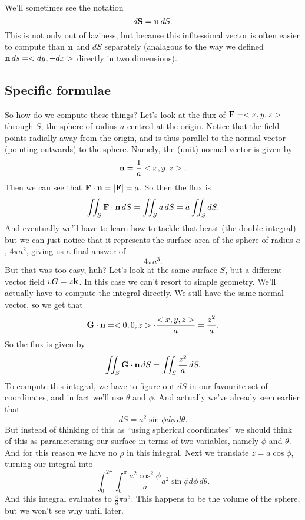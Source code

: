 We'll sometimes see the notation
\[ d\boldsymbol{\mathbf{S}} = \boldsymbol{\mathbf{n}}\,dS. \]
This is not only out of laziness, but because this infitessimal vector is often easier to compute than $\boldsymbol{\mathbf{n}}$ and $dS$ separately (analagous to the way we defined $\boldsymbol{\mathbf{n}}\,ds = <dy,-dx>$ directly in two dimensions).
\edf

\subsection{Specific formulae}
So how do we compute these things? 
\bex
Let's look at the flux of $\boldsymbol{\mathbf{F}} = <x,y,z>$ through $S$, the sphere of radius $a$ centred at the origin. Notice that the field points radially away from the origin, and is thus parallel to the normal vector (pointing outwards) to the sphere. Namely, the (unit) normal vector is given by
\[ \boldsymbol{\mathbf{n}} = \frac 1a <x,y,z>. \]
Then we can see that $\boldsymbol{\mathbf{F}} \cdot \boldsymbol{\mathbf{n}} = |\boldsymbol{\mathbf{F}}| = a$. So then the flux is
\[ \iint_S \boldsymbol{\mathbf{F}} \cdot \boldsymbol{\mathbf{n}}\,dS = \iint_S a\,dS = a \iint_S dS. \]
And eventually we'll have to learn how to tackle that beast (the double integral) but we can just notice that it represents the surface area of the sphere of radius $a$, $4\pi a^2$, giving us a final answer of 
\[ 4\pi a^3. \]
\eex
But that was too easy, huh?
\bex
Let's look at the same surface $S$, but a different vector field $vG = z\boldsymbol{\mathbf{k}}$. In this case we can't resort to simple geometry. We'll actually have to compute the integral directly. We still have the same normal vector, so we get that
\[ \boldsymbol{\mathbf{G}} \cdot \boldsymbol{\mathbf{n}} = <0,0,z> \cdot \frac{<x,y,z>}a = \frac{z^2}a. \]
So the flux is given by
\[ \iint_S \boldsymbol{\mathbf{G}} \cdot \boldsymbol{\mathbf{n}} \, dS = \iint_S \frac{z^2}a \, dS. \]
To compute this integral, we have to figure out $dS$ in our favourite set of coordinates, and in fact we'll use $\theta$ and $\phi$. And actually we've already seen earlier that
\[ dS = a^2 \sin \phi d\phi\,d\theta. \]
But instead of thinking of this as ``using spherical coordinates'' we should think of this as parameterising our surface in terms of two variables, namely $\phi$ and $\theta$. And for this reason we have no $\rho$ in this integral. Next we translate
$z = a \cos \phi$, turning our integral into
\[ \int_0^{2\pi} \int_0^\pi \frac{a^2 \cos^2 \phi}a a^2 \sin \phi d\phi\,d\theta. \]
And this integral evaluates to $\frac 43 \pi a^3$. This happens to be the volume of the sphere, but we won't see why until later. 
\eex

